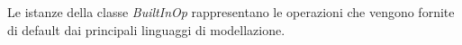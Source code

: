 
Le istanze della classe \textit{BuiltInOp} rappresentano le operazioni che vengono fornite di default dai principali linguaggi di modellazione.